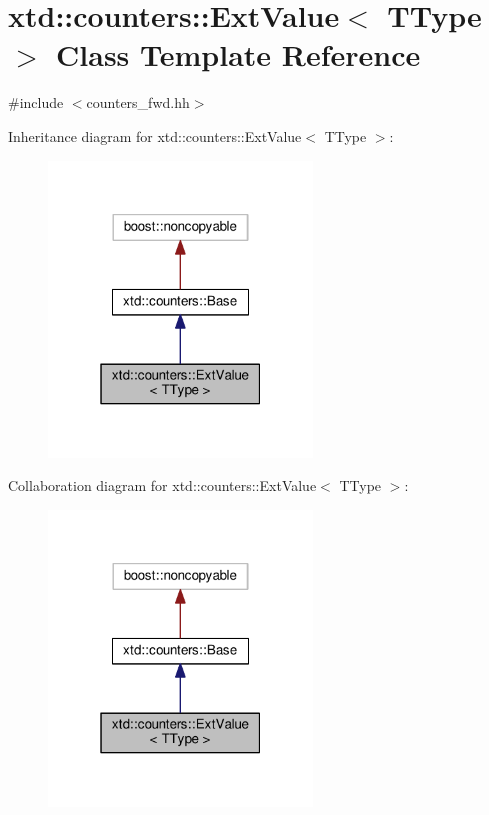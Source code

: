\hypertarget{classxtd_1_1counters_1_1ExtValue}{}\section{xtd\+:\+:counters\+:\+:Ext\+Value$<$ T\+Type $>$ Class Template Reference}
\label{classxtd_1_1counters_1_1ExtValue}


{\ttfamily \#include $<$counters\+\_\+fwd.\+hh$>$}



Inheritance diagram for xtd\+:\+:counters\+:\+:Ext\+Value$<$ T\+Type $>$\+:
\nopagebreak
\begin{figure}[H]
\begin{center}
\leavevmode
\includegraphics[width=199pt]{classxtd_1_1counters_1_1ExtValue__inherit__graph}
\end{center}
\end{figure}


Collaboration diagram for xtd\+:\+:counters\+:\+:Ext\+Value$<$ T\+Type $>$\+:
\nopagebreak
\begin{figure}[H]
\begin{center}
\leavevmode
\includegraphics[width=199pt]{classxtd_1_1counters_1_1ExtValue__coll__graph}
\end{center}
\end{figure}
